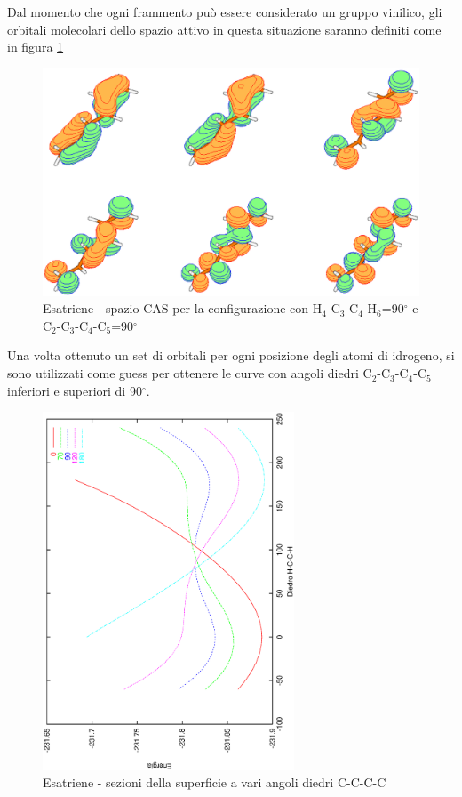 Dal momento che ogni frammento pu\`o essere considerato un gruppo vinilico,
gli orbitali molecolari dello spazio attivo in questa situazione saranno 
definiti come in figura \ref{fig:esatriene_orbitali_c90_h90}
\pagebreak

\begin{figure}[htb]
\caption{\small Esatriene - spazio CAS per la configurazione con 
\mbox{H$_4$-C$_3$-C$_4$-H$_6$}=90$^{\circ}$ e
\mbox{C$_2$-C$_3$-C$_4$-C$_5$}=90$^{\circ}$ }
\label{fig:esatriene_orbitali_c90_h90}
\begin{center}
\includegraphics[width=12cm,keepaspectratio]{immagini/esatriene/orbitali_c90_h90.eps}
\end{center}
\end{figure}

Una volta ottenuto un set di orbitali per ogni posizione degli atomi di
idrogeno, si sono utilizzati come guess per ottenere le curve con angoli
diedri \mbox{C$_2$-C$_3$-C$_4$-C$_5$} inferiori e superiori di 90$^{\circ}$.

\begin{figure}
\includegraphics[angle=270,width=75mm,keepaspectratio]{immagini/esatriene/inviluppo.eps}
\caption{\small Esatriene - sezioni della superficie a vari angoli diedri C-C-C-C }
\label{fig:esatriene_inviluppo}
\end{figure}

